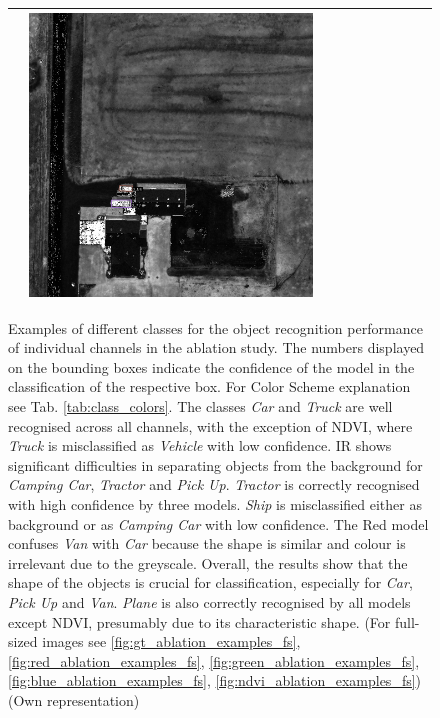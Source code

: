 \begin{figure}[h!]
\begin{tabularx}{\textwidth}{c|*{9}{X}}
    & \includegraphics[trim={300pt 355pt 610pt 570pt},clip,width=\linewidth]{images/015Results/03ablation/comp_images/ndvi/198.png} \\ \hline
\end{tabularx}
\caption[Ablation Studies: Examples of different classes for the object recognition performance]{Examples of different classes for the object recognition performance of individual channels in the ablation study. The numbers displayed on the bounding boxes indicate the confidence of the model in the classification of the respective box. For Color Scheme explanation see Tab. \ref{tab:class_colors}. The classes \textit{Car} and \textit{Truck} are well recognised across all channels, with the exception of NDVI, where \textit{Truck} is misclassified as \textit{Vehicle} with low confidence. IR shows significant difficulties in separating objects from the background for \textit{Camping Car}, \textit{Tractor} and \textit{Pick Up}. \textit{Tractor} is correctly recognised with high confidence by three models. \textit{Ship} is misclassified either as background or as \textit{Camping Car} with low confidence. The Red model confuses \textit{Van} with \emph{Car} because the shape is similar and colour is irrelevant due to the greyscale. Overall, the results show that the shape of the objects is crucial for classification, especially for \textit{Car}, \textit{Pick Up} and \textit{Van}. \textit{Plane} is also correctly recognised by all models except NDVI, presumably due to its characteristic shape. (For full-sized images see \ref{fig:gt_ablation_examples_fs}, \ref{fig:red_ablation_examples_fs}, \ref{fig:green_ablation_examples_fs}, \ref{fig:blue_ablation_examples_fs}, \ref{fig:ndvi_ablation_examples_fs}) (Own representation)}
\label{fig:ablation_example_pics}
\end{figure}